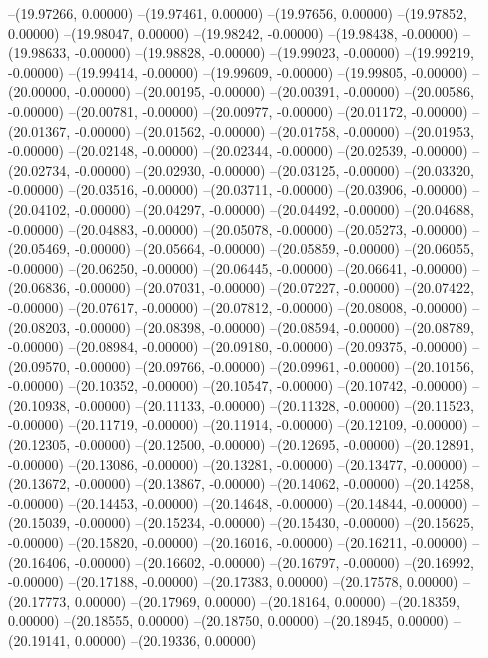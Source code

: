 --(19.97266, 0.00000)
--(19.97461, 0.00000)
--(19.97656, 0.00000)
--(19.97852, 0.00000)
--(19.98047, 0.00000)
--(19.98242, -0.00000)
--(19.98438, -0.00000)
--(19.98633, -0.00000)
--(19.98828, -0.00000)
--(19.99023, -0.00000)
--(19.99219, -0.00000)
--(19.99414, -0.00000)
--(19.99609, -0.00000)
--(19.99805, -0.00000)
--(20.00000, -0.00000)
--(20.00195, -0.00000)
--(20.00391, -0.00000)
--(20.00586, -0.00000)
--(20.00781, -0.00000)
--(20.00977, -0.00000)
--(20.01172, -0.00000)
--(20.01367, -0.00000)
--(20.01562, -0.00000)
--(20.01758, -0.00000)
--(20.01953, -0.00000)
--(20.02148, -0.00000)
--(20.02344, -0.00000)
--(20.02539, -0.00000)
--(20.02734, -0.00000)
--(20.02930, -0.00000)
--(20.03125, -0.00000)
--(20.03320, -0.00000)
--(20.03516, -0.00000)
--(20.03711, -0.00000)
--(20.03906, -0.00000)
--(20.04102, -0.00000)
--(20.04297, -0.00000)
--(20.04492, -0.00000)
--(20.04688, -0.00000)
--(20.04883, -0.00000)
--(20.05078, -0.00000)
--(20.05273, -0.00000)
--(20.05469, -0.00000)
--(20.05664, -0.00000)
--(20.05859, -0.00000)
--(20.06055, -0.00000)
--(20.06250, -0.00000)
--(20.06445, -0.00000)
--(20.06641, -0.00000)
--(20.06836, -0.00000)
--(20.07031, -0.00000)
--(20.07227, -0.00000)
--(20.07422, -0.00000)
--(20.07617, -0.00000)
--(20.07812, -0.00000)
--(20.08008, -0.00000)
--(20.08203, -0.00000)
--(20.08398, -0.00000)
--(20.08594, -0.00000)
--(20.08789, -0.00000)
--(20.08984, -0.00000)
--(20.09180, -0.00000)
--(20.09375, -0.00000)
--(20.09570, -0.00000)
--(20.09766, -0.00000)
--(20.09961, -0.00000)
--(20.10156, -0.00000)
--(20.10352, -0.00000)
--(20.10547, -0.00000)
--(20.10742, -0.00000)
--(20.10938, -0.00000)
--(20.11133, -0.00000)
--(20.11328, -0.00000)
--(20.11523, -0.00000)
--(20.11719, -0.00000)
--(20.11914, -0.00000)
--(20.12109, -0.00000)
--(20.12305, -0.00000)
--(20.12500, -0.00000)
--(20.12695, -0.00000)
--(20.12891, -0.00000)
--(20.13086, -0.00000)
--(20.13281, -0.00000)
--(20.13477, -0.00000)
--(20.13672, -0.00000)
--(20.13867, -0.00000)
--(20.14062, -0.00000)
--(20.14258, -0.00000)
--(20.14453, -0.00000)
--(20.14648, -0.00000)
--(20.14844, -0.00000)
--(20.15039, -0.00000)
--(20.15234, -0.00000)
--(20.15430, -0.00000)
--(20.15625, -0.00000)
--(20.15820, -0.00000)
--(20.16016, -0.00000)
--(20.16211, -0.00000)
--(20.16406, -0.00000)
--(20.16602, -0.00000)
--(20.16797, -0.00000)
--(20.16992, -0.00000)
--(20.17188, -0.00000)
--(20.17383, 0.00000)
--(20.17578, 0.00000)
--(20.17773, 0.00000)
--(20.17969, 0.00000)
--(20.18164, 0.00000)
--(20.18359, 0.00000)
--(20.18555, 0.00000)
--(20.18750, 0.00000)
--(20.18945, 0.00000)
--(20.19141, 0.00000)
--(20.19336, 0.00000)
